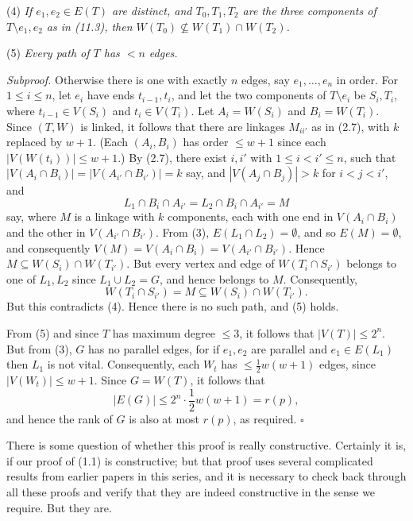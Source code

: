\hspace*{12pt}(4) \textit{If $e_1, e_2 \in E(T)$ are distinct, and $T_0, T_1, T_2$ are the three components of $T \setminus e_1, e_2$ as in (11.3), then $W(T_0) \not\subseteq W(T_1) \cap W(T_2)$.}

\hspace*{12pt}(5) \textit{Every path of $T$ has $< n$ edges.}

\textit{Subproof.} Otherwise there is one with exactly $n$ edges, say $e_1, \dots, e_n$ in order. For $1 \le i \le n$, let $e_i$ have ends $t_{i-1}, t_i$, and let the two components of $T \setminus e_i$ be $S_i, T_i$, where $t_{i-1} \in V(S_i)$ and $t_i \in V(T_i)$. Let $A_i = W(S_i)$ and $B_i = W(T_i)$. Since $(T, W)$ is linked, it follows that there are linkages $M_{ii'}$ as in (2.7), with $k$ replaced by $w + 1$. (Each $(A_i, B_i)$ has order $\le w + 1$ since each $|V(W(t_i))| \le w + 1$.) By (2.7), there exist $i, i'$ with $1 \le i < i' \le n$, such that $|V(A_i \cap B_i)| = |V(A_{i'} \cap B_{i'})| = k$ say, and $|V(A_j \cap B_j)| > k$ for $i < j < i'$, and
\begin{equation*}
L_1 \cap B_i \cap A_{i'} = L_2 \cap B_i \cap A_{i'} = M
\end{equation*}
say, where $M$ is a linkage with $k$ components, each with one end in $V(A_i \cap B_i)$ and the other in $V(A_{i'} \cap B_{i'})$. From (3), $E(L_1 \cap L_2) = \emptyset$, and so $E(M) = \emptyset$, and consequently $V(M) = V(A_i \cap B_i) = V(A_{i'} \cap B_{i'})$. Hence $M \subseteq W(S_i) \cap W(T_{i'})$. But every vertex and edge of $W(T_i \cap S_{i'})$ belongs to one of $L_1, L_2$ since $L_1 \cup L_2 = G$, and hence belongs to $M$. Consequently,
\begin{equation*}
W(T_i \cap S_{i'}) = M \subseteq W(S_i) \cap W(T_{i'}).
\end{equation*}
But this contradicts (4). Hence there is no such path, and (5) holds.

From (5) and since $T$ has maximum degree $\le 3$, it follows that $|V(T)| \le 2^n$. But from (3), $G$ has no parallel edges, for if $e_1, e_2$ are parallel and $e_1 \in E(L_1)$ then $L_1$ is not vital. Consequently, each $W_t$ has $\le \frac{1}{2}w(w + 1)$ edges, since $|V(W_t)| \le w + 1$. Since $G = W(T)$, it follows that
\begin{equation*}
|E(G)| \le 2^n \cdot \frac{1}{2}w(w + 1) = r(p),
\end{equation*}
and hence the rank of $G$ is also at most $r(p)$, as required. $\square$

There is some question of whether this proof is really constructive. Certainly it is, if our proof of (1.1) is constructive; but that proof uses several complicated results from earlier papers in this series, and it is necessary to check back through all these proofs and verify that they are indeed constructive in the sense we require. But they are.
